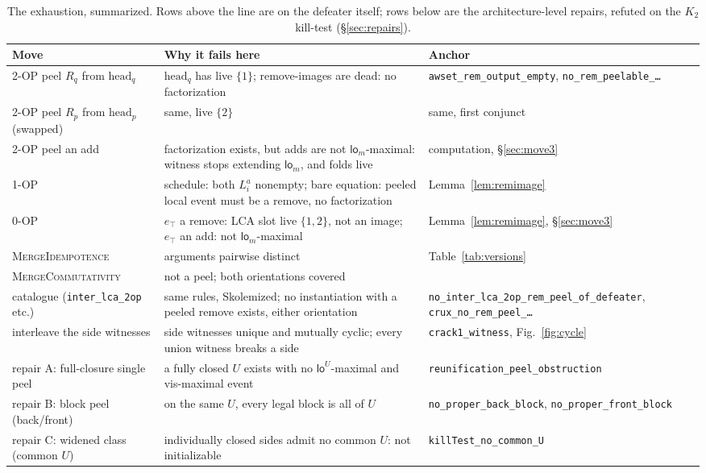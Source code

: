 \documentclass[11pt]{article}
\newcommand{\loE}[1]{\mathsf{lo}^{#1}}
\newcommand{\lom}{\mathsf{lo}_m}
\newcommand{\lean}[1]{\texttt{#1}}
\newcommand{\Rp}{R_p}
\newcommand{\Rq}{R_q}
\begin{document}
\begin{table}[t]
\centering
\small
\begin{tabular}{@{}p{4.6cm}p{5.6cm}p{4.3cm}@{}}
\toprule
Move & Why it fails here & Anchor \\
\midrule
\textsc{2-OP} peel $\Rq$ from $\mathrm{head}_q$ &
$\mathrm{head}_q$ has live $\{1\}$; remove-images are dead: no
factorization &
\lean{awset\_rem\_output\_}\allowbreak\lean{empty},
\lean{no\_rem\_peelable\_\ldots}
\\
\textsc{2-OP} peel $\Rp$ from $\mathrm{head}_p$ (swapped) &
same, live $\{2\}$ &
same, first conjunct \\
\textsc{2-OP} peel an add &
factorization exists, but adds are not $\lom$-maximal: witness stops
extending $\lom$, and folds live &
computation, \S\ref{sec:move3} \\
\textsc{1-OP} &
schedule: both $L_i^a$ nonempty; bare equation: peeled local event
must be a remove, no factorization &
Lemma~\ref{lem:remimage} \\
\textsc{0-OP} &
$e_\top$ a remove: LCA slot live $\{1,2\}$, not an image;
$e_\top$ an add: not $\lom$-maximal &
Lemma~\ref{lem:remimage}, \S\ref{sec:move3} \\
\textsc{MergeIdempotence} &
arguments pairwise distinct &
Table~\ref{tab:versions} \\
\textsc{MergeCommutativity} &
not a peel; both orientations covered &
\\
catalogue (\lean{inter\_lca\_2op} etc.) &
same rules, Skolemized; no instantiation with a peeled remove exists,
either orientation &
\lean{no\_inter\_lca\_2op\_}\allowbreak\lean{rem\_peel\_of\_defeater},
\lean{crux\_no\_rem\_}\allowbreak\lean{peel\_\ldots} \\
interleave the side witnesses &
side witnesses unique and mutually cyclic; every union witness breaks
a side &
\lean{crack1\_witness}, Fig.~\ref{fig:cycle} \\
\midrule
repair A: full-closure single peel &
a fully closed $U$ exists with no $\loE{U}$-maximal and vis-maximal
event &
\lean{reunification\_peel\_}\allowbreak\lean{obstruction} \\
repair B: block peel (back/front) &
on the same $U$, every legal block is all of $U$ &
\lean{no\_proper\_back\_block},
\lean{no\_proper\_front\_block} \\
repair C: widened class (common $U$) &
individually closed sides admit no common $U$: not initializable &
\lean{killTest\_no\_common\_U} \\
\bottomrule
\end{tabular}
\caption{The exhaustion, summarized. Rows above the line are on the
defeater itself; rows below are the architecture-level repairs, refuted
on the $K_2$ kill-test (\S\ref{sec:repairs}).}
\label{tab:exhaust}
\end{table}
\end{document}
